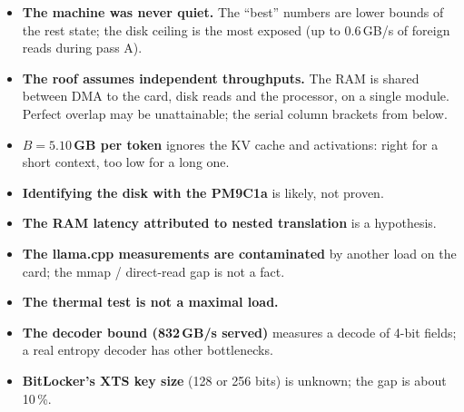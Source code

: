 \begin{faux}
\begin{itemize}
\item \textbf{The machine was never quiet.} The \enquote{best} numbers are lower bounds of the rest state; the disk ceiling is the most exposed (up to 0.6\,GB/s of foreign reads during pass A).
\item \textbf{The roof assumes independent throughputs.} The RAM is shared between DMA to the card, disk reads and the processor, on a single module. Perfect overlap may be unattainable; the serial column brackets from below.
\item \textbf{$B = 5.10$\,GB per token} ignores the KV cache and activations: right for a short context, too low for a long one.
\item \textbf{Identifying the disk with the PM9C1a} is likely, not proven.
\item \textbf{The RAM latency attributed to nested translation} is a hypothesis.
\item \textbf{The llama.cpp measurements are contaminated} by another load on the card; the mmap / direct-read gap is not a fact.
\item \textbf{The thermal test is not a maximal load.}
\item \textbf{The decoder bound (832\,GB/s served)} measures a decode of 4-bit fields; a real entropy decoder has other bottlenecks.
\item \textbf{BitLocker's XTS key size} (128 or 256 bits) is unknown; the gap is about 10\,\%.
\end{itemize}
\end{faux}
